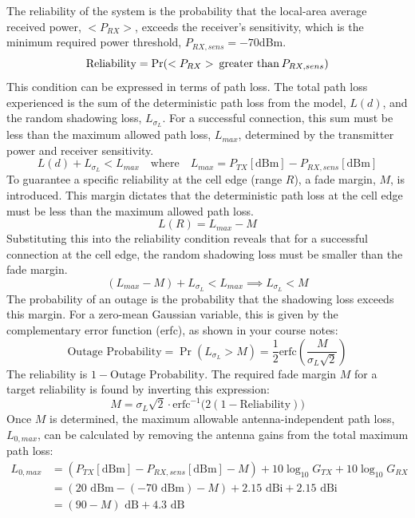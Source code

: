 The reliability of the system is the probability that the local-area average received power, $<P_{RX}>$, exceeds the receiver's sensitivity, which is the minimum required power threshold, $P_{RX,{sens}} = -70$dBm.
\begin{equation}
	\text{Reliability} = \Pr(<P_{RX}> \hspace{0.2em} \text{greater than} \hspace{0.2em} P_{RX,{sens}})
\end{equation}
This condition can be expressed in terms of path loss. The total path loss experienced is the sum of the deterministic path loss from the model, $L(d)$, and the random shadowing loss, $L_{\sigma_L}$. For a successful connection, this sum must be less than the maximum allowed path loss, $L_{max}$, determined by the transmitter power and receiver sensitivity.
\begin{equation}
	L(d) + L_{\sigma_L} < L_{max} \quad \text{where} \quad L_{max} = P_{TX}[\text{dBm}] - P_{RX,{sens}}[\text{dBm}]
\end{equation}
To guarantee a specific reliability at the cell edge (range $R$), a {fade margin}, $M$, is introduced. This margin dictates that the deterministic path loss at the cell edge must be less than the maximum allowed path loss.
\begin{equation}
	L(R) = L_{max} - M
\end{equation}
Substituting this into the reliability condition reveals that for a successful connection at the cell edge, the random shadowing loss must be smaller than the fade margin.
\begin{equation}
	(L_{max} - M) + L_{\sigma_L} < L_{max} \implies L_{\sigma_L} < M
\end{equation}
The probability of an outage is the probability that the shadowing loss exceeds this margin. For a zero-mean Gaussian variable, this is given by the complementary error function (erfc), as shown in your course notes:
\begin{equation}
	\text{Outage Probability} = \Pr(L_{\sigma_L} > M) = \frac{1}{2} \text{erfc}\left(\frac{M}{\sigma_L\sqrt{2}}\right)
\end{equation}
The reliability is $1 - \text{Outage Probability}$. The required fade margin $M$ for a target reliability is found by inverting this expression:
\begin{equation}
	\label{eq:fade_margin_calc}
	M = \sigma_L \sqrt{2} \cdot \text{erfc}^{-1}\big(2(1 - \text{Reliability})\big)
\end{equation}
Once $M$ is determined, the maximum allowable antenna-independent path loss, $L_{0,max}$, can be calculated by removing the antenna gains from the total maximum path loss:
\begin{align}
	L_{0,max} &= (P_{TX}[\text{dBm}] - P_{RX,{sens}}[\text{dBm}] - M) + 10 \log_{10} G_{TX} + 10 \log_{10} G_{RX} \\
	&= (20 \text{ dBm} - (-70 \text{ dBm}) - M) + 2.15 \text{ dBi} + 2.15 \text{ dBi} \\
	&= (90 - M) \text{ dB} + 4.3 \text{ dB} \\
\end{align}

